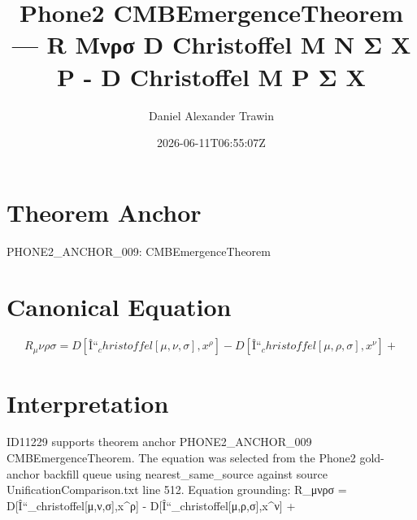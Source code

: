 \documentclass[11pt]{article}
\title{Phone2 CMBEmergenceTheorem — R Μνρσ D Christoffel Μ Ν Σ X Ρ - D Christoffel Μ Ρ Σ X}
\author{Daniel Alexander Trawin}
\date{2026-06-11T06:55:07Z}
\begin{document}
\maketitle
\section*{Theorem Anchor}
PHONE2_ANCHOR_009: CMBEmergenceTheorem
\section*{Canonical Equation}
\[
R_μνρσ = D[Î“_christoffel[μ,ν,σ],x^ρ] - D[Î“_christoffel[μ,ρ,σ],x^ν] +
\]
\section*{Interpretation}
ID11229 supports theorem anchor PHONE2_ANCHOR_009 CMBEmergenceTheorem. The equation was selected from the Phone2 gold-anchor backfill queue using nearest_same_source against source UnificationComparison.txt line 512. Equation grounding: R_μνρσ = D[Î“_christoffel[μ,ν,σ],x^ρ] - D[Î“_christoffel[μ,ρ,σ],x^ν] +
\end{document}
